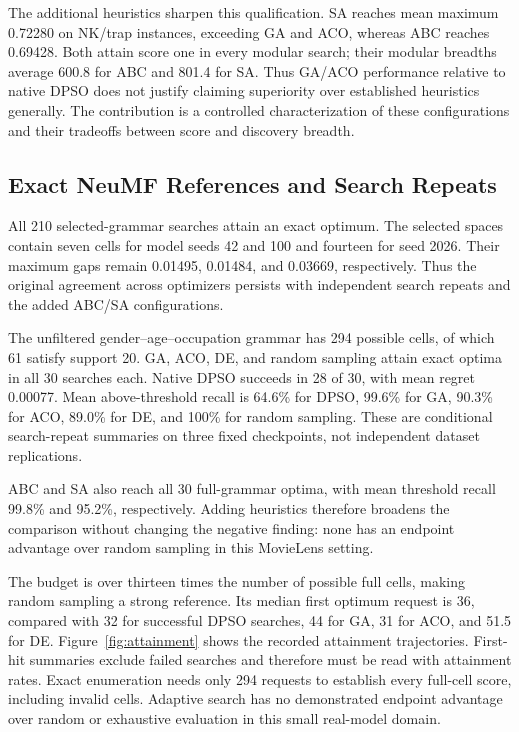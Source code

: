 The additional heuristics sharpen this qualification. SA reaches mean maximum 0.72280 on NK/trap instances, exceeding GA and ACO, whereas ABC reaches 0.69428. Both attain score one in every modular search; their modular breadths average 600.8 for ABC and 801.4 for SA. Thus GA/ACO performance relative to native DPSO does not justify claiming superiority over established heuristics generally. The contribution is a controlled characterization of these configurations and their tradeoffs between score and discovery breadth.

\subsection{Exact NeuMF References and Search Repeats}

All 210 selected-grammar searches attain an exact optimum. The selected spaces contain seven cells for model seeds 42 and 100 and fourteen for seed 2026. Their maximum gaps remain 0.01495, 0.01484, and 0.03669, respectively. Thus the original agreement across optimizers persists with independent search repeats and the added ABC/SA configurations.

The unfiltered gender--age--occupation grammar has 294 possible cells, of which 61 satisfy support 20. GA, ACO, DE, and random sampling attain exact optima in all 30 searches each. Native DPSO succeeds in 28 of 30, with mean regret 0.00077. Mean above-threshold recall is 64.6\% for DPSO, 99.6\% for GA, 90.3\% for ACO, 89.0\% for DE, and 100\% for random sampling. These are conditional search-repeat summaries on three fixed checkpoints, not independent dataset replications.

ABC and SA also reach all 30 full-grammar optima, with mean threshold recall 99.8\% and 95.2\%, respectively. Adding heuristics therefore broadens the comparison without changing the negative finding: none has an endpoint advantage over random sampling in this MovieLens setting.

The budget is over thirteen times the number of possible full cells, making random sampling a strong reference. Its median first optimum request is 36, compared with 32 for successful DPSO searches, 44 for GA, 31 for ACO, and 51.5 for DE. Figure~\ref{fig:attainment} shows the recorded attainment trajectories. First-hit summaries exclude failed searches and therefore must be read with attainment rates. Exact enumeration needs only 294 requests to establish every full-cell score, including invalid cells. Adaptive search has no demonstrated endpoint advantage over random or exhaustive evaluation in this small real-model domain.

